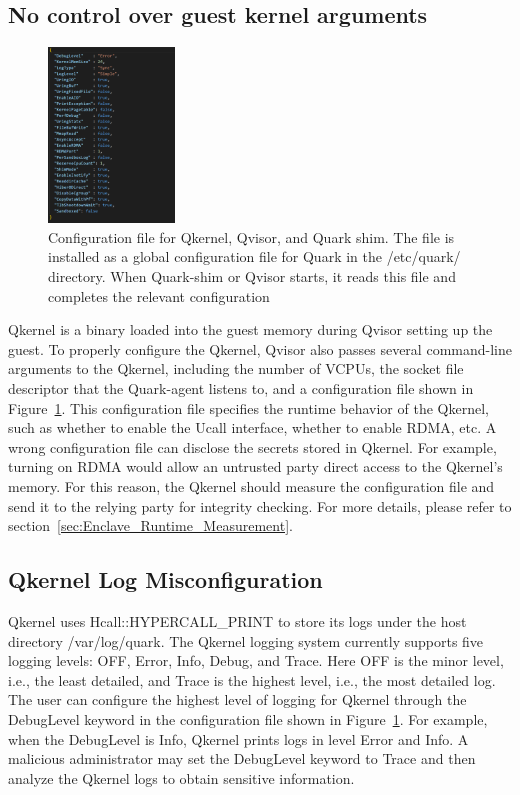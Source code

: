 \subsection{No control over guest kernel arguments}
\begin{figure}[htp]
  \centering
  \includegraphics[width=0.3\textwidth]{images/quark_config.PNG}
  \caption[Configuration file for Qkernel, Qvisor, and Quark shim]{Configuration file for Qkernel, Qvisor, and Quark shim. The file is installed as a global configuration file for Quark in the /etc/quark/ directory. When Quark-shim or Qvisor starts, it reads this file and completes the relevant configuration}
  \label{fig:quark_config}
\end{figure}

Qkernel is a binary loaded into the guest memory during Qvisor setting up the guest. To properly configure the Qkernel, Qvisor also passes several command-line arguments to the Qkernel, including the number of VCPUs, the socket file descriptor that the Quark-agent listens to, and a configuration 
file shown in Figure~\ref{fig:quark_config}. This configuration file specifies the runtime behavior of the Qkernel, such as whether to enable the Ucall interface, whether to enable RDMA, etc. A wrong configuration file can disclose the secrets stored in Qkernel. For example, turning on RDMA would allow an untrusted 
party direct access to the Qkernel’s memory. For this reason, the Qkernel should measure the configuration file and send it to the relying party for integrity checking. For more details, please refer to section~\ref{sec:Enclave_Runtime_Measurement}.

\subsection{Qkernel Log Misconfiguration}
\label{sec:Qkernel_Log_Misconfiguration}
Qkernel uses Hcall::HYPERCALL\_PRINT to store its logs under the host directory /var/log/quark. The Qkernel logging system currently supports five logging levels: OFF, Error, Info, Debug, and Trace. Here OFF is the minor level, i.e., the least detailed, and Trace is the highest level, i.e., 
the most detailed log. The user can configure the highest level of logging for Qkernel through the DebugLevel keyword in the configuration file shown in Figure~\ref{fig:quark_config}. For example, when the DebugLevel is Info, Qkernel prints logs in level Error and Info. A malicious administrator may set the 
DebugLevel keyword to Trace and then analyze the Qkernel logs to obtain sensitive information.

